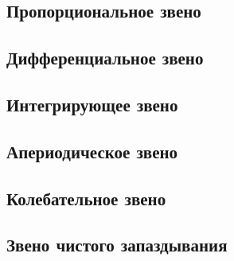 \documentclass[../../TAU.tex]{subfiles}
\begin{document}
\subsection{Пропорциональное звено} %


\subsection{Дифференциальное звено} %


\subsection{Интегрирующее звено} %


\subsection{Апериодическое звено} %


\subsection{Колебательное звено} %


\subsection{Звено чистого запаздывания} %



\end{document}
